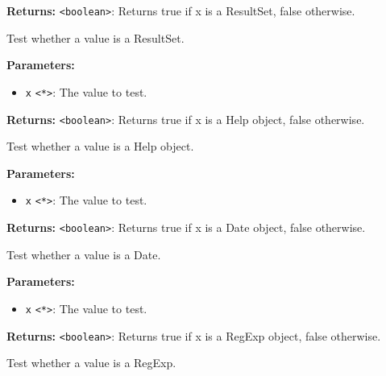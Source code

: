 \documentclass[12pt,a4paper]{article}
\begin{document}
\noindent \textbf{Returns:} \texttt{<boolean>}: Returns true if \textasciigrave{}x\textasciigrave{} is a ResultSet, false otherwise.

\noindent Test whether a value is a ResultSet.

\vspace{5mm}
\noindent {}


\noindent \textbf{Parameters:}
\begin{itemize}
  \item \texttt{x} \texttt{<*>}: The value to test.
\end{itemize}

\noindent \textbf{Returns:} \texttt{<boolean>}: Returns true if \textasciigrave{}x\textasciigrave{} is a Help object, false otherwise.

\noindent Test whether a value is a Help object.

\vspace{5mm}
\noindent {}


\noindent \textbf{Parameters:}
\begin{itemize}
  \item \texttt{x} \texttt{<*>}: The value to test.
\end{itemize}

\noindent \textbf{Returns:} \texttt{<boolean>}: Returns true if \textasciigrave{}x\textasciigrave{} is a Date object, false otherwise.

\noindent Test whether a value is a Date.

\vspace{5mm}
\noindent {}


\noindent \textbf{Parameters:}
\begin{itemize}
  \item \texttt{x} \texttt{<*>}: The value to test.
\end{itemize}

\noindent \textbf{Returns:} \texttt{<boolean>}: Returns true if \textasciigrave{}x\textasciigrave{} is a RegExp object, false otherwise.

\noindent Test whether a value is a RegExp.
\end{document}
